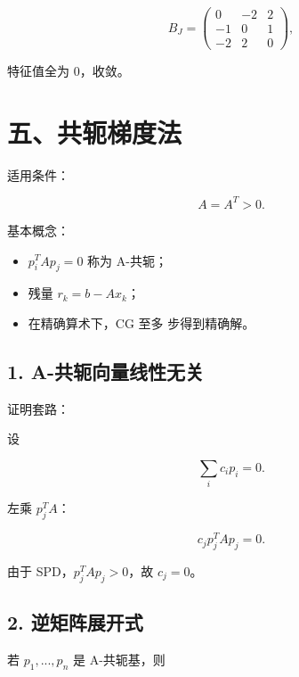 \documentclass[11pt,a4paper]{ctexart}
\newcommand{\code}[1]{\begingroup\ttfamily\small #1\endgroup}
\begin{document}
\[
B_J=
\begin{pmatrix}
0&-2&2\\
-1&0&1\\
-2&2&0
\end{pmatrix},
\]

特征值全为 0，收敛。


\section*{五、共轭梯度法}


适用条件：

\[
A=A^T>0.
\]

基本概念：

\begin{itemize}

\item $p_i^T A p_j=0$ 称为 A-共轭；

\item 残量 $r_k=b-Ax_k$；

\item 在精确算术下，CG 至多 \code{} 步得到精确解。

\end{itemize}


\subsection*{1. A-共轭向量线性无关}


证明套路：

设

\[
\sum_i c_i p_i=0.
\]

左乘 $p_j^T A$：

\[
c_j p_j^T A p_j=0.
\]

由于 \code{} SPD，$p_j^T A p_j>0$，故 $c_j=0$。


\subsection*{2. 逆矩阵展开式}


若 $p_1,...,p_n$ 是 A-共轭基，则
\end{document}
